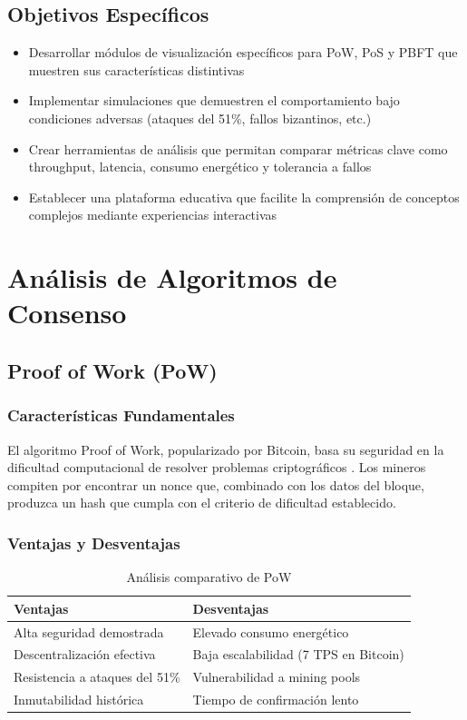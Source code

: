 \documentclass[spanish,12pt,letterpaper]{report}
\begin{document}
\subsection{Objetivos Específicos}

\begin{itemize}
    \item Desarrollar módulos de visualización específicos para PoW, PoS y PBFT que muestren sus características distintivas
    \item Implementar simulaciones que demuestren el comportamiento bajo condiciones adversas (ataques del 51\%, fallos bizantinos, etc.)
    \item Crear herramientas de análisis que permitan comparar métricas clave como throughput, latencia, consumo energético y tolerancia a fallos
    \item Establecer una plataforma educativa que facilite la comprensión de conceptos complejos mediante experiencias interactivas
\end{itemize}

\section{Análisis de Algoritmos de Consenso}

\subsection{Proof of Work (PoW)}

\subsubsection{Características Fundamentales}

El algoritmo Proof of Work, popularizado por Bitcoin, basa su seguridad en la dificultad computacional de resolver problemas criptográficos \cite{nakamoto2008bitcoin}. Los mineros compiten por encontrar un nonce que, combinado con los datos del bloque, produzca un hash que cumpla con el criterio de dificultad establecido.

\subsubsection{Ventajas y Desventajas}

\begin{table}[h]
\centering
\begin{tabular}{|p{6cm}|p{6cm}|}
\hline
\textbf{Ventajas} & \textbf{Desventajas} \\
\hline
Alta seguridad demostrada & Elevado consumo energético \\
Descentralización efectiva & Baja escalabilidad (7 TPS en Bitcoin) \\
Resistencia a ataques del 51\% & Vulnerabilidad a mining pools \\
Inmutabilidad histórica & Tiempo de confirmación lento \\
\hline
\end{tabular}
\caption{Análisis comparativo de PoW}
\label{tab:pow-comparison}
\end{table}
\end{document}

